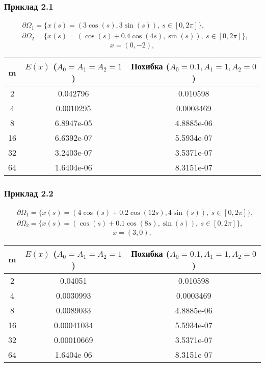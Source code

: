 \documentclass[12pt]{report}
\begin{document}
 \subsubsection{Приклад 2.1}
 
 \begin{equation}
 \begin{split}
 	&\partial\Omega_1= \{x(s)=(3\cos(s), 3\sin(s)),\ s\in[0,2\pi]\},\\
	&\partial\Omega_2= \{x(s)=(\cos(s)+0.4 \cos(4s),\sin(s)),\ s\in[0,2\pi]\},
 \end{split}
 \end{equation}
 $$x=(0, -2),$$
 
\begin{center}
\begin{tabular}{ |c|c|c| } 
 \hline
 m & \shortstack{$E(x)$  \\  ($A_0=A_1=A_2=1$)}  & \shortstack{Похибка  \\  ($A_0=0.1, A_1= 1,A_2=0$)}  \\ 
 \hline
 2 & 0.042796 & 0.010598 \\ 
 4 & 0.0010295 & 0.0003469 \\ 
 8 & 6.8947e-05 & 4.8885e-06 \\ 
16 & 6.6392e-07 & 5.5934e-07 \\ 
32 & 3.2403e-07 & 3.5371e-07 \\ 
64 & 1.6404e-06 & 8.3151e-07 \\ 
 \hline
\end{tabular}
\end{center}

\subsubsection{Приклад 2.2}

 \begin{equation}
 \begin{split}
 	&\partial\Omega_1= \{x(s)=(4\cos(s) + 0.2\cos(12s),4\sin(s)),\ s\in[0,2\pi]\},\\
	&\partial\Omega_2= \{x(s)=(\cos(s) + 0.1 \cos(8s),\sin(s)),\ s\in[0,2\pi]\},
 \end{split}
 \end{equation}
 $$x=(3, 0),$$
 
\begin{center}
\begin{tabular}{ |c|c|c| } 
 \hline
 m & \shortstack{$E(x)$  \\  ($A_0=A_1=A_2=1$)}  & \shortstack{Похибка  \\  ($A_0=0.1, A_1= 1,A_2=0$)}  \\ 
 \hline
 2 & 0.04051 & 0.010598 \\ 
 4 & 0.0030993 & 0.0003469 \\ 
 8 & 0.0089033 & 4.8885e-06 \\ 
16 & 0.00041034 & 5.5934e-07 \\ 
32 & 0.00010669 & 3.5371e-07 \\ 
64 & 1.6404e-06 & 8.3151e-07 \\ 
 \hline
\end{tabular}
\end{center}
\end{document}
